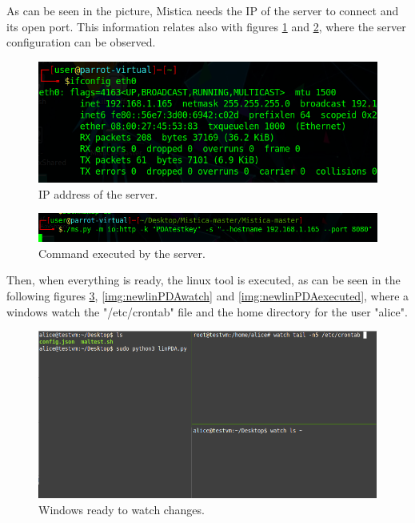 As can be seen in the picture, Mistica needs the IP of the server to connect and its open port. This information relates also with figures \ref{img:newlinPDAsrvipconfig} and \ref{img:newlinPDAsrvstart}, where the server configuration can be observed.

\begin{figure}[!htb]
	\centering
	\includegraphics[width=14cm]{img/newlinPDA-ifconfigserver}
	\caption{IP address of the server.}
	\label{img:newlinPDAsrvipconfig}
\end{figure}

\begin{figure}[!htb]
	\centering
	\includegraphics[width=14cm]{img/newlinPDA-servertstart}
	\caption{Command executed by the server.}
	\label{img:newlinPDAsrvstart}
\end{figure}

\pagebreak
Then, when everything is ready, the linux tool is executed, as can be seen in the following figures \ref{img:newlinPDAbeforewatch}, \ref{img:newlinPDAwatch} and \ref{img:newlinPDAexecuted}, where a windows watch the "/etc/crontab" file and the home directory for the user "alice".

\begin{figure}[!htb]
	\centering
	\includegraphics[width=14cm]{img/newlinPDA-watchready}
	\caption{Windows ready to watch changes.}
	\label{img:newlinPDAbeforewatch}
\end{figure}

